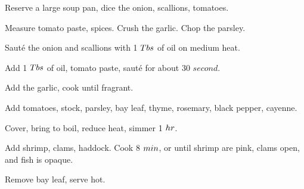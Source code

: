 \begin{preparation}
\item Reserve a large soup pan, dice the onion, scallions, tomatoes.
\item Measure tomato paste, spices.
	Crush the garlic.
	Chop the parsley.
\item Saut\'{e} the onion and scallions with 1 $\Tablespoon$ of oil on medium heat.
\item Add 1 $\Tablespoon$ of oil, tomato paste, saut\'{e} for about 30 $second$.
\item Add the garlic, cook until fragrant.
\item Add tomatoes, stock, parsley, bay leaf, thyme, rosemary, black pepper, cayenne.
\item Cover, bring to boil, reduce heat, simmer 1 $\hour$.
\item Add shrimp, clams, haddock.
	Cook 8 $\minute$, or until shrimp are pink, clams open, and fish is opaque.
\item Remove bay leaf, serve hot.
\end{preparation}


\recipeend%
